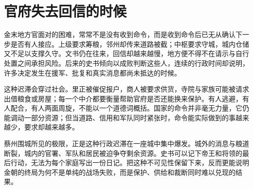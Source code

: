 \section{官府失去回信的时候}

金末地方官面对的困难，常常不是没有收到命令，而是收到命令后已无从确认下一步是否有人接应。上级要求筹粮，邻州却传来道路被截；中枢要求守城，城内仓储又不足以支撑久守。文书仍在往来，回信却越来越慢，地方便不得不在请示与自行处置之间承担风险。后来的史书倾向以成败判断这些人，连续的行政时间却说明，许多决定发生在援军、批复和真实消息都尚未抵达的时候。

这种迟滞会穿过社会。里正被催促报户，商人被要求供货，寺院与家族可能被请求出借粮食或房屋；每一个中介都要衡量帮助官府是否还能换来保护。有人逃避，有人配合，有人两面周旋，不能以一个道德词概括。国家的命令并非毫无力量，它仍能调动一部分资源；但当道路、信用和军队同时紧张时，命令能实际做到的事越来越少，要求却越来越多。

蔡州围城所见的极限，正是这种行政迟滞在一座城中集中爆发。城外的消息与粮道断裂，城内的官署、军队和居民被迫争夺剩余资源。史书可以记下帝王和将领的最后行动，无法为每个家庭写出一份日记。把这种不可见性保留下来，反而更能说明金朝的终局为何不是单纯的战场失败，而是保护、供给和裁断同时难以兑现的结果。
